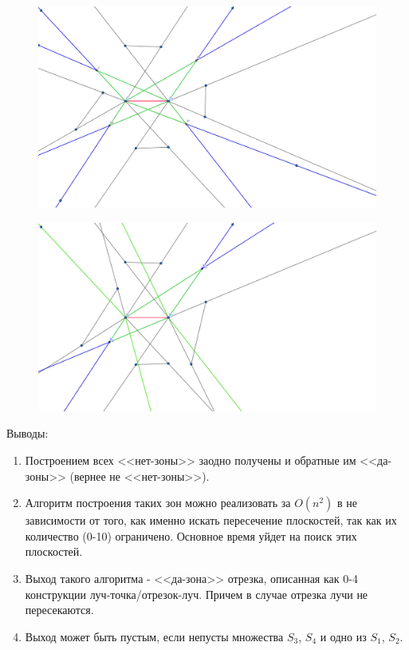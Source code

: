 \documentclass[letterpaper,12pt]{article}
\begin{document}
\begin{enumerate}
\begin{figure}[H]
                  \includegraphics[width=0.5\linewidth]{nozone_4_1.png}
            \end{figure}
            \begin{figure}[H]
                  \centering
                  \includegraphics[width=0.5\linewidth]{nozone_4_2.png}
            \end{figure}
\end{enumerate}
Выводы:
\begin{enumerate}
      \item Построением всех <<нет-зоны>> заодно получены и 
            обратные им <<да-зоны>> (вернее не <<нет-зоны>>).
      \item Алгоритм построения таких зон можно реализовать за
            $O(n^2)$ в не зависимости от того, как именно искать
            пересечение плоскостей, так как их количество (0-10)
            ограничено. Основное время уйдет на поиск этих
            плоскостей.
      \item Выход такого алгоритма - <<да-зона>> отрезка,
            описанная как 0-4 конструкции луч-точка/отрезок-луч.
            Причем в случае отрезка лучи не пересекаются.
      \item Выход может быть пустым, если непусты 
            множества $S_3$, $S_4$ и одно из $S_1$, $S_2$.
\end{enumerate}
\end{document}
